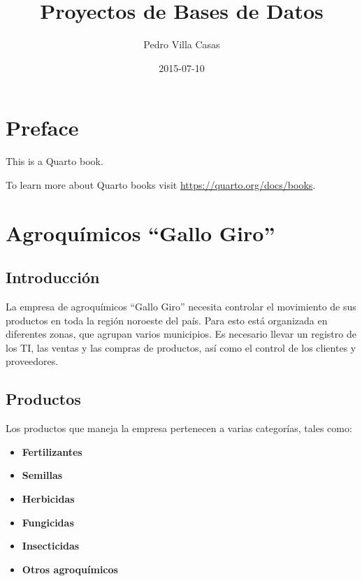 \documentclass[
  letterpaper,
  DIV=11,
  numbers=noendperiod]{scrreprt}
\title{Proyectos de Bases de Datos}
\author{Pedro Villa Casas}
\date{2015-07-10}
\providecommand{\tightlist}{%
  \setlength{\itemsep}{0pt}\setlength{\parskip}{0pt}}\usepackage{longtable,booktabs,array}
\renewcommand*\contentsname{Table of contents}
\newcommand\contentsname{Table of contents}
\begin{document}
\maketitle

\renewcommand*\contentsname{Table of contents}
{
\hypersetup{linkcolor=}
\setcounter{tocdepth}{2}
\tableofcontents
}


\chapter{Preface}\label{preface}

This is a Quarto book.

To learn more about Quarto books visit
\url{https://quarto.org/docs/books}.


\chapter{Agroquímicos ``Gallo Giro''}\label{agroquuxedmicos-gallo-giro}

\section{Introducción}\label{introducciuxf3n}

La empresa de agroquímicos ``Gallo Giro'' necesita controlar el
movimiento de sus productos en toda la región noroeste del país. Para
esto está organizada en diferentes zonas, que agrupan varios municipios.
Es necesario llevar un registro de los TI, las ventas y las compras de
productos, así como el control de los clientes y proveedores.

\section{Productos}\label{productos}

Los productos que maneja la empresa pertenecen a varias categorías,
tales como:

\begin{itemize}
\tightlist
\item
  \textbf{Fertilizantes}
\item
  \textbf{Semillas}
\item
  \textbf{Herbicidas}
\item
  \textbf{Fungicidas}
\item
  \textbf{Insecticidas}
\item
  \textbf{Otros agroquímicos}
\end{itemize}
\end{document}
